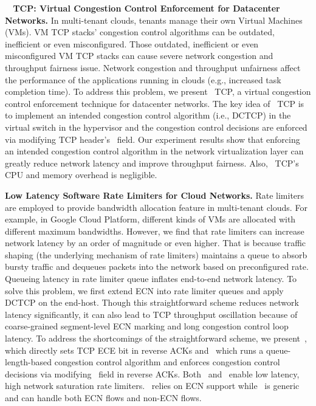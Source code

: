 {\bf ~\acdc{} TCP: Virtual Congestion Control Enforcement for Datacenter Networks.}
 In multi-tenant clouds, tenants manage their own Virtual Machines (VMs). VM TCP stacks' congestion 
control algorithms can be outdated, inefficient or even misconfigured. Those outdated, inefficient 
or even misconfigured VM TCP stacks can cause severe network congestion and throughput fairness issue. 
Network congestion and throughput unfairness affect the performance of the applications running in 
clouds (e.g., increased task completion time). To address this problem, we present~\acdc{} TCP, 
a virtual congestion control enforcement technique for datacenter networks. The key idea of~\acdc{} TCP 
is to implement an intended congestion control algorithm (i.e., DCTCP) in the virtual switch in the hypervisor 
and the congestion control decisions are enforced via modifying TCP header's~\rwnd{} field. 
Our experiment results show that enforcing an intended congestion control algorithm in 
the network virtualization layer can greatly reduce network latency and improve throughput fairness. 
Also,~\acdc{} TCP's CPU and memory overhead is negligible.  

{\bf Low Latency Software Rate Limiters for Cloud Networks.}
 Rate limiters are employed to provide bandwidth allocation feature in multi-tenant clouds. 
For example, in Google Cloud Platform, different kinds of VMs are allocated with 
different maximum bandwidths. However, we find that rate limiters can increase network latency 
by an order of magnitude or even higher. That is because traffic shaping 
(the underlying mechanism of rate limiters) maintains a queue to absorb bursty traffic 
and dequeues packets into the network based on preconfigured rate. 
Queueing latency in rate limiter queue inflates end-to-end network latency.
To solve this 
problem, we first extend ECN into rate limiter queues and apply DCTCP on the end-host. 
Though this straightforward scheme reduces network latency significantly, it can also 
lead to TCP throughput oscillation because of coarse-grained segment-level ECN marking 
and long congestion control loop latency. To address the shortcomings of the straightforward scheme, 
we present~\dem{}, which directly sets TCP ECE bit in reverse ACKs and~\spring{} which runs 
a queue-length-based congestion control algorithm and enforces congestion control decisions 
via modifying~\rwnd{} field in reverse ACKs. Both~\dem{} and~\spring{} enable low latency, 
high network saturation rate limiters.~\dem{} relies on ECN support while~\spring{} is 
generic and can handle both ECN flows and non-ECN flows.

